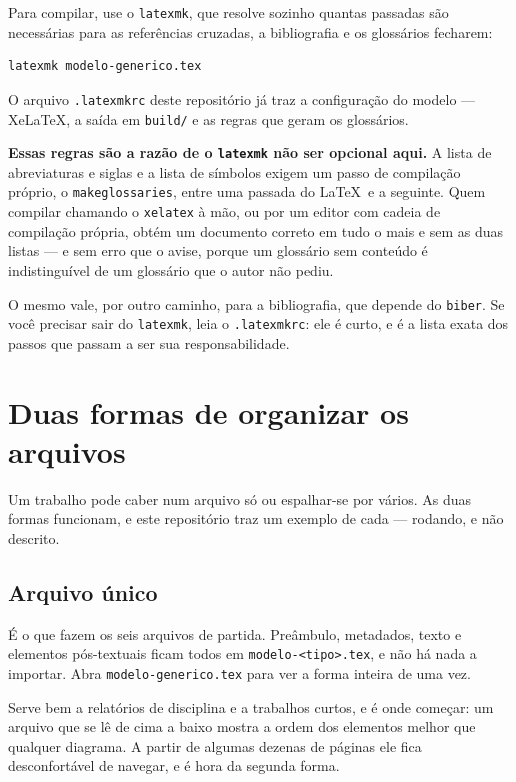 Para compilar, use o \texttt{latexmk}, que resolve sozinho quantas passadas são necessárias para
as referências cruzadas, a bibliografia e os glossários fecharem:

\begin{Verbatim}[fontsize=\small]
latexmk modelo-generico.tex
\end{Verbatim}

O arquivo \texttt{.latexmkrc} deste repositório já traz a configuração do modelo --- XeLaTeX, a
saída em \texttt{build/} e as regras que geram os glossários.

\textbf{Essas regras são a razão de o \texttt{latexmk} não ser opcional aqui.} A lista de
abreviaturas e siglas e a lista de símbolos exigem um passo de compilação próprio, o
\texttt{makeglossaries}, entre uma passada do \LaTeX\ e a seguinte. Quem compilar chamando o
\texttt{xelatex} à mão, ou por um editor com cadeia de compilação própria, obtém um documento
correto em tudo o mais e sem as duas listas --- e sem erro que o avise, porque um glossário sem
conteúdo é indistinguível de um glossário que o autor não pediu.

O mesmo vale, por outro caminho, para a bibliografia, que depende do \texttt{biber}. Se você
precisar sair do \texttt{latexmk}, leia o \texttt{.latexmkrc}: ele é curto, e é a lista exata dos
passos que passam a ser sua responsabilidade.

\section{Duas formas de organizar os arquivos}\label{sec:estrutura-desenvolvimento}

Um trabalho pode caber num arquivo só ou espalhar-se por vários. As duas formas funcionam, e este
repositório traz um exemplo de cada --- rodando, e não descrito.

\subsection{Arquivo único}\label{ssc:arquivo-unico}

É o que fazem os seis arquivos de partida. Preâmbulo, metadados, texto e elementos pós-textuais
ficam todos em \texttt{modelo-<tipo>.tex}, e não há nada a importar. Abra \texttt{modelo-generico.tex}
para ver a forma inteira de uma vez.

Serve bem a relatórios de disciplina e a trabalhos curtos, e é onde começar: um arquivo que se lê
de cima a baixo mostra a ordem dos elementos melhor que qualquer diagrama. A partir de algumas
dezenas de páginas ele fica desconfortável de navegar, e é hora da segunda forma.


